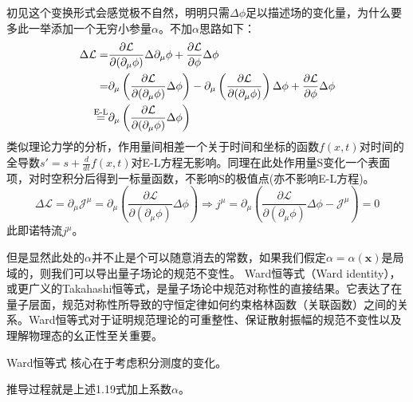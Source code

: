 \documentclass[../main.tex]{subfiles}
\begin{document}
\begin{note}
    初见这个变换形式会感觉极不自然，明明只需$\Delta \phi$足以描述场的变化量，为什么要多此一举添加一个无穷小参量$\alpha$。不加$\alpha$思路如下：
    \begin{align}
        \Delta \mathcal{L} = & \frac{\partial \mathcal{L}}{\partial (\partial_{\mu}\phi)}\Delta \partial_{\mu}\phi + \frac{\partial \mathcal{L}}{\partial\phi}\Delta\phi \notag \\
                           = & \partial_{\mu} \left( \frac{\partial \mathcal{L}}{\partial (\partial_{\mu}\phi)} \Delta\phi \right) - \partial_{\mu} \left( \frac{\partial \mathcal{L}}{\partial (\partial_{\mu}\phi)} \right)\Delta\phi + \frac{\partial \mathcal{L}}{\partial \phi}\Delta\phi \notag \\
    \overset{\text{E-L}}{=}  & \partial_{\mu} \left( \frac{\partial \mathcal{L}}{\partial (\partial_{\mu}\phi)} \Delta\phi \right)
    \end{align}
    类似理论力学的分析，作用量间相差一个关于时间和坐标的函数$f(x,t)$对时间的全导数$s' = s + \frac{d}{dt}f(x,t)$对E-L方程无影响。同理在此处作用量S变化一个表面项，对时空积分后得到一标量函数，不影响S的极值点(亦不影响E-L方程)。
    \begin{equation}
        \Delta \mathcal{L} = \partial_{\mu}\mathcal{J}^{\mu} = \partial_{\mu} \left( \frac{\partial \mathcal{L}}{\partial (\partial_{\mu}\phi)} \Delta\phi \right) \Rightarrow j^{\mu} = \partial_{\mu} \left( \frac{\partial \mathcal{L}}{\partial (\partial_{\mu}\phi)} \Delta\phi -\mathcal{J}^{\mu} \right) = 0
    \end{equation}
    此即诺特流$j^{\mu}$。
    
    但是显然此处的$\alpha$并不止是个可以随意消去的常数，如果我们假定$\alpha= \alpha(\bm{x})$是局域的，则我们可以导出量子场论的规范不变性。
    Ward恒等式（Ward identity），或更广义的Takahashi恒等式，是量子场论中规范对称性的直接结果。它表达了在量子层面，规范对称性所导致的守恒定律如何约束格林函数（关联函数）之间的关系。Ward恒等式对于证明规范理论的可重整性、保证散射振幅的规范不变性以及理解物理态的幺正性至关重要。
    \begin{theorem}{Ward恒等式}
        核心在于考虑积分测度的变化。
    \end{theorem}

\end{note}
    推导过程就是上述1.19式加上系数$\alpha$。
\end{document}
